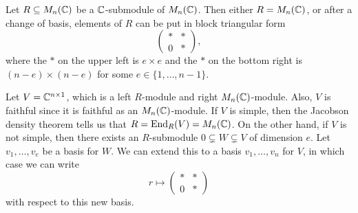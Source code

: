\begin{prop}{}
    Let $R \subseteq M_n(\mathbb{C})$ be a $\mathbb{C}$-submodule of $M_n(\mathbb{C})$. Then either 
    $R = M_n(\mathbb{C})$, or after a change of basis, elements of $R$ can be 
    put in block triangular form 
    \[ \begin{pmatrix}
        * & * \\ 0 & * 
    \end{pmatrix}, \] 
    where the $*$ on the upper left is $e \times e$ and the $*$ on the 
    bottom right is $(n-e) \times (n-e)$ for some $e \in \{1, \dots, n-1\}$. 
\end{prop}
\begin{pf}
    Let $V = \mathbb{C}^{n\times 1}$, which is a left $R$-module and right 
    $M_n(\mathbb{C})$-module. Also, $V$ is faithful since it is faithful as an 
    $M_n(\mathbb{C})$-module. If $V$ is simple, then the Jacobson density theorem 
    tells us that $R = \operatorname{End}_R(V) = M_n(\mathbb{C})$. On the other hand, if $V$ 
    is not simple, then there exists an $R$-submodule $0 \subsetneq W 
    \subsetneq V$ of dimension $e$. Let $v_1, \dots, v_e$ be a basis for $W$. 
    We can extend this to a basis $v_1, \dots, v_n$ for $V$, in which 
    case we can write 
    \[ r \mapsto \begin{pmatrix}
        * & * \\ 0 & *
    \end{pmatrix} \] 
    with respect to this new basis. 
\end{pf}

